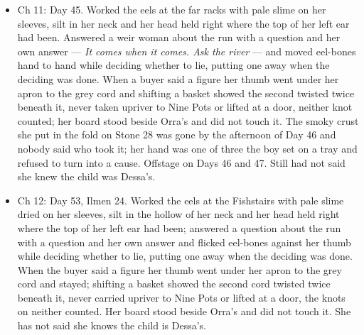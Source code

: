 \documentclass{design/chronicle}
\begin{document}
{\begin{itemize}[leftmargin=1.4em,itemsep=1pt,topsep=3pt,parsep=0pt]

\item Ch 11: Day 45. Worked the eels at the far racks with pale slime on her sleeves, silt in her neck and her head held right where the top of her left ear had been. Answered a weir woman about the run with a question and her own answer --- \emph{It comes when it comes. Ask the river} --- and moved eel-bones hand to hand while deciding whether to lie, putting one away when the deciding was done. When a buyer said a figure her thumb went under her apron to the grey cord and shifting a basket showed the second twisted twice beneath it, never taken upriver to Nine Pots or lifted at a door, neither knot counted; her board stood beside Orra’s and did not touch it. The smoky crust she put in the fold on Stone 28 was gone by the afternoon of Day 46 and nobody said who took it; her hand was one of three the boy set on a tray and refused to turn into a cause. Offstage on Days 46 and 47. Still had not said she knew the child was Dessa’s.

\end{itemize}

\begin{itemize}[leftmargin=1.4em,itemsep=1pt,topsep=3pt,parsep=0pt]

\item Ch 12: Day 53, Ilmen 24. Worked the eels at the Fishstairs with pale slime dried on her sleeves, silt in the hollow of her neck and her head held right where the top of her left ear had been; answered a question about the run with a question and her own answer and flicked eel-bones against her thumb while deciding whether to lie, putting one away when the deciding was done. When the buyer said a figure her thumb went under her apron to the grey cord and stayed; shifting a basket showed the second cord twisted twice beneath it, never carried upriver to Nine Pots or lifted at a door, the knots on neither counted. Her board stood beside Orra’s and did not touch it. She has not said she knows the child is Dessa’s.

\end{itemize}

\begin{itemize}[leftmargin=1.4em,itemsep=1pt,topsep=3pt,parsep=0pt]


\end{itemize}}
\end{document}
